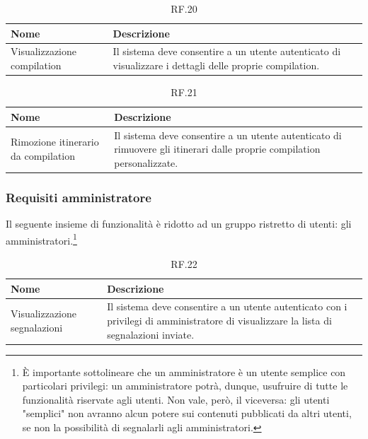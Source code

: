 \documentclass{natourDoc}
\begin{document}
\begin{table}[H]
	\centering
	\begin{tabular}{ |p{5cm}|p{10.3cm}| }
		\hline
		\rowcolor{PineGreen!70}
		\textbf{Nome}               & \textbf{Descrizione}                                                          \\
		\hline
		Visualizzazione compilation & Il sistema deve consentire a un utente autenticato di visualizzare i dettagli
		delle proprie compilation.                                                                                  \\
		\hline
	\end{tabular}
	\caption{RF.20}

\end{table}


\begin{table}[H]
	\centering
	\begin{tabular}{ |p{5cm}|p{10.3cm}| }
		\hline
		\rowcolor{PineGreen!70}
		\textbf{Nome}                       & \textbf{Descrizione}                                                          \\
		\hline
		Rimozione itinerario da compilation & Il sistema deve consentire a un utente autenticato di rimuovere gli itinerari
		dalle proprie compilation personalizzate.                                                                           \\
		\hline
	\end{tabular}
	\caption{RF.21}

\end{table}

\subsubsection{Requisiti amministratore}
Il seguente insieme di funzionalità è ridotto ad un gruppo ristretto di utenti: gli amministratori.\footnote{È importante sottolineare che un amministratore è un utente semplice con particolari privilegi:
	un amministratore potrà, dunque, usufruire di tutte le funzionalità riservate agli
	utenti. Non vale, però, il viceversa: gli utenti "semplici" non avranno alcun potere
	sui contenuti pubblicati da altri utenti, se non la possibilità di segnalarli agli
	amministratori.}

\begin{table}[H]
	\centering
	\begin{tabular}{ |p{5cm}|p{10.3cm}| }
		\hline
		\rowcolor{PineGreen!70}
		\textbf{Nome}                & \textbf{Descrizione}                                                                                 \\
		\hline
		Visualizzazione segnalazioni & Il sistema deve consentire a un utente autenticato con i privilegi di amministratore di visualizzare
		la lista di segnalazioni inviate.                                                                                                   \\
		\hline
	\end{tabular}
	\caption{RF.22}

\end{table}
\end{document}
